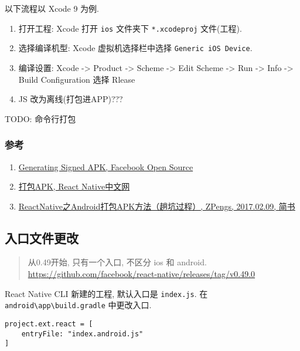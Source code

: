 以下流程以 Xcode 9 为例.

\begin{enumerate}
\def\labelenumi{\arabic{enumi}.}
\tightlist
\item
  打开工程: Xcode 打开 \lstinline!ios! 文件夹下 \lstinline!*.xcodeproj!
  文件(工程).
\item
  选择编译机型: Xcode 虚拟机选择栏中选择 \lstinline!Generic iOS Device!.
\item
  编译设置: Xcode -\textgreater{} Product -\textgreater{} Scheme
  -\textgreater{} Edit Scheme -\textgreater{} Run -\textgreater{} Info
  -\textgreater{} Build Configuration 选择 Rlease
\item
  JS 改为离线(打包进APP)???
\end{enumerate}

TODO: 命令行打包

\subsubsection{参考}\label{ux53c2ux8003-1}

\begin{enumerate}
\def\labelenumi{\arabic{enumi}.}
\tightlist
\item
  \href{https://facebook.github.io/react-native/docs/signed-apk-android.html}{Generating
  Signed APK, Facebook Open Source}
\item
  \href{https://reactnative.cn/docs/0.51/signed-apk-android.html}{打包APK,
  React Native中文网}
\item
  \href{https://www.jianshu.com/p/1380d4c8b596}{ReactNative之Android打包APK方法（趟坑过程）,
  ZPengs, 2017.02.09, 简书}
\end{enumerate}

\subsection{入口文件更改}\label{ux5165ux53e3ux6587ux4ef6ux66f4ux6539}

\begin{quote}
从0.49开始, 只有一个入口, 不区分 ios 和 android.
\url{https://github.com/facebook/react-native/releases/tag/v0.49.0}
\end{quote}

React Native CLI 新建的工程, 默认入口是 \lstinline!index.js!. 在
\lstinline!android\app\build.gradle! 中更改入口.

\begin{lstlisting}
project.ext.react = [
    entryFile: "index.android.js"
]
\end{lstlisting}

